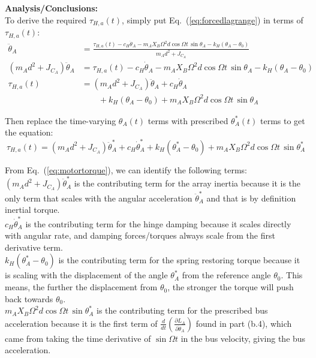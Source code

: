 \documentclass[titlepage]{article}
\begin{document}
\textbf{Analysis/Conclusions:}\\
To derive the required $\tau_{H,a}(t)$, simply put Eq.~(\ref{eq:forcedlagrange}) in terms of $\tau_{H,a}(t)$:
\begin{equation}
	\begin{split}
		\ddot{\theta}_A&=\frac{\tau_{H,a}(t)-c_H\dot{\theta}_A-m_AX_B\Omega^2d\cos\Omega t\,\sin\theta_A-k_H\left(\theta_A-\theta_0\right)}{m_Ad^2+J_{C_A}} \\
		\left(m_Ad^2+J_{C_A}\right)\ddot{\theta}_A&=\tau_{H,a}(t)-c_H\dot{\theta}_A-m_AX_B\Omega^2d\cos\Omega t\,\sin\theta_A-k_H\left(\theta_A-\theta_0\right) \\
		\tau_{H,a}(t)&=\left(m_Ad^2+J_{C_A}\right)\ddot{\theta}_A+c_H\dot{\theta}_A \\
		&\qquad+k_H\left(\theta_A-\theta_0\right)+m_AX_B\Omega^2d\cos\Omega t\,\sin\theta_A
	\end{split}
\end{equation}


\begin{mdframed}[linewidth=1pt, innertopmargin=10pt, innerbottommargin=10pt]
	Then replace the time-varying $\theta_A(t)$ terms with prescribed $\theta_A^*(t)$ terms to get the equation:
	\begin{equation}
		\tau_{H,a}(t)=\left(m_Ad^2+J_{C_A}\right)\ddot{\theta}_A^*+c_H\dot{\theta}_A^*+k_H\left(\theta_A^*-\theta_0\right)+m_AX_B\Omega^2d\cos\Omega t\,\sin\theta_A^*
		\label{eq:motortorque}
	\end{equation}
	
	From Eq.~(\ref{eq:motortorque}), we can identify the following terms:\\
	
	$\left(m_Ad^2+J_{C_A}\right)\ddot{\theta}_A^*$ is the contributing term for the array inertia because it is the only term that scales with the angular acceleration $\ddot{\theta}_A^*$ and that is by definition inertial torque. \\
	
	$c_H\dot{\theta}_A^*$ is the contributing term for the hinge damping because it scales directly with angular rate, and damping forces/torques always scale from the first derivative term. \\
	
	$k_H\left(\theta_A^*-\theta_0\right)$ is the contributing term for the spring restoring torque because it is scaling with the displacement of the angle $\theta_A^*$ from the reference angle $\theta_0$. This means, the further the displacement from $\theta_0$, the stronger the torque will push back towards $\theta_0$.\\
	
	$m_AX_B\Omega^2d\cos\Omega t\,\sin\theta_A^*$ is the contributing term for the prescribed bus acceleration because it is the first term of $\frac{d}{dt}\left(\frac{\partial L_A}{\partial\dot{\theta}_A}\right)$ found in part (b.4), which came from taking the time derivative of $\sin\Omega t$ in the bus velocity, giving the bus acceleration.
\end{mdframed}
\end{document}
